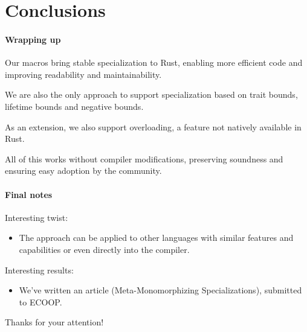 \section{Conclusions}\label{sec:conclusions}


\begin{frame}{\secname}
	\framesubtitle{Wrapping up}

	Our macros bring \alert{stable specialization} to Rust, enabling more efficient code and improving readability and maintainability.

	\bigskip

	We are also the only approach to support specialization based on \alert{trait bounds}, \alert{lifetime bounds} and \alert{negative bounds}.

	\bigskip

	As an extension, we also support \alert{overloading}, a feature not natively available in Rust. %

	\bigskip

	All of this works without compiler modifications, preserving \alert{soundness} and ensuring easy adoption by the community.

\end{frame}


\begin{frame}{\secname}
	\framesubtitle{Final notes}

	\Large Interesting twist:
	\normalsize
	\begin{itemize}
		\item The approach can be applied to other \alert{languages} with similar features and capabilities %
		      or even directly into the \alert{compiler}. %
	\end{itemize}

	\bigskip

	\Large Interesting results:
	\normalsize
	\begin{itemize}
		\item We've written an article (\alert{Meta-Monomorphizing Specializations}), submitted to \alert{ECOOP}.
	\end{itemize}

\end{frame}


\begin{frame}
	\begin{center}
		\huge Thanks for your attention!
	\end{center}
\end{frame}